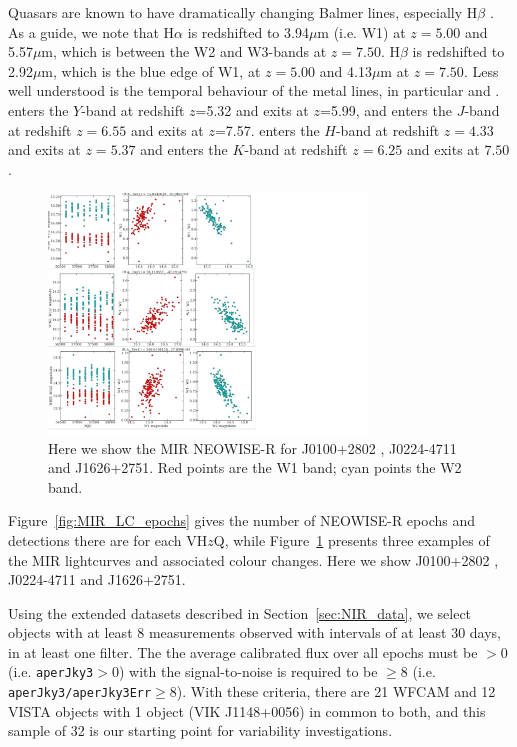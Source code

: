\documentclass[usenatbib]{mnras}
\begin{document}
Quasars are known to have dramatically changing Balmer lines,
especially H$\beta$ \citep[e.g.,][]{LaMassa2015, Ruan2016, Runnoe2016,
Macleod2016, Gezari2017, Runco2016, YangQ2018, Assef2018, Stern2018,
Ross2018, MacLeod2019, Graham2019}. As a guide, we note that H$\alpha$
is redshifted to 3.94$\mu$m (i.e. W1) at $z=5.00$ and 5.57$\mu$m,
which is between the W2 and W3-bands at $z=7.50$.  H$\beta$ is
redshifted to 2.92$\mu$m, which is the blue edge of W1, at $z=5.00$
and 4.13$\mu$m at $z=7.50$. Less well understood is the temporal
behaviour of the metal lines, in particular \civ and \mgii.  \civ
enters the $Y$-band at redshift $z$=5.32 and exits at $z$=5.99, and
enters the $J$-band at redshift $z=6.55$ and exits at $z$=7.57. \mgii
enters the $H$-band at redshift $z=4.33$ and exits at $z=5.37$ and
enters the $K$-band at redshift $z=6.25$ and exits at $7.50$.


\begin{figure}
  \includegraphics[width=8.5cm]
  {../light_curves/MIR_LCs/three_MIR_LC_egs_20180827.pdf}
  \centering
  \caption[]
  {Here we show the MIR NEOWISE-R for J0100+2802 \citep{Wu2015}, J0224-4711 and  J1626+2751. 
    Red points are the W1 band; cyan points the W2 band.} 
  \label{fig:MIR_LC_3egs}
\end{figure}
Figure~\ref{fig:MIR_LC_epochs} gives the number of NEOWISE-R epochs
and detections there are for each VH$z$Q, while
Figure~\ref{fig:MIR_LC_3egs} presents three examples of the MIR
lightcurves and associated colour changes. Here we show J0100+2802
\citep{Wu2015}, J0224-4711 and J1626+2751.

Using the extended datasets described in Section~\ref{sec:NIR_data},
we select objects with at least 8 measurements observed with intervals
of at least 30 days, in at least one filter. The the average
calibrated flux over all epochs must be $>0$ (i.e. {\tt aperJky3}$>0$)
with the signal-to-noise is required to be $\geq8$ (i.e. {\tt
aperJky3/aperJky3Err}$\geq$8). With these criteria, there are 21 WFCAM 
and 12 VISTA objects with 1 object (VIK J1148+0056) in common to both, 
and this sample of 32 is our starting
point for variability investigations.
\end{document}
